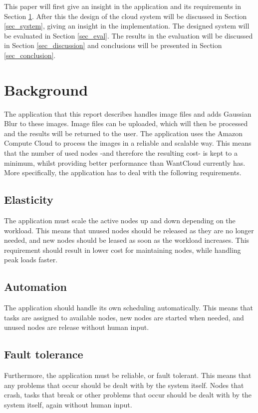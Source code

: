 \documentclass{acm_proc_article-sp}
\begin{document}
This paper will first give an insight in the application and its requirements in Section \ref{sec_bg}.
After this the design of the cloud system will be discussed in Section \ref{sec_system}, giving an insight in the implementation.
The designed system will be evaluated in Section \ref{sec_eval}.
The results in the evaluation will be discussed in Section \ref{sec_discussion} and conclusions will be presented in Section \ref{sec_conclusion}.

\section{Background}
\label{sec_bg}
The application that this report describes handles image files and adds Gaussian Blur to these images.
Image files can be uploaded, which will then be processed and the results will be returned to the user.
The application uses the Amazon Compute Cloud to process the images in a reliable and scalable way.
This means that the number of used nodes -and therefore the resulting cost- is kept to a minimum, whilst providing better performance than WantCloud currently has.
More specifically, the application has to deal with the following requirements.

\subsection{Elasticity}
The application must scale the active nodes up and down depending on the workload.
This means that unused nodes should be released as they are no longer needed, and new nodes should be leased as soon as the workload increases.
This requirement should result in lower cost for maintaining nodes, while handling peak loads faster.

\subsection{Automation}
The application should handle its own scheduling automatically.
This means that tasks are assigned to available nodes, new nodes are started when needed, and unused nodes are release without human input.

\subsection{Fault tolerance}
Furthermore, the application must be reliable, or fault tolerant.
This means that any problems that occur should be dealt with by the system itself.
Nodes that crash, tasks that break or other problems that occur should be dealt with by the system itself, again without human input.
\end{document}
